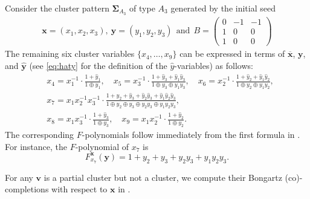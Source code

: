 \documentclass[11pt,reqno]{amsart}
\theoremstyle{plain}
\theoremstyle{definition}
\newtheorem{example}[theorem]{Example}
\numberwithin{equation}{section}
\newcommand\<{\langle}
\renewcommand\>{\rangle}
\def\vv{\mathbf{v}}
\newcommand{\DynA}[1]{A_{#1}}%
\def\seeds{\mathbf{\Sigma}}
\def\xx{\mathbf{x}}%
\def\yy{\mathbf{y}}%
\def\Fpoly{{F}}
\newcommand{\ol}[1]{\overline{#1}}
\begin{document}
Consider the cluster pattern $\seeds_{\DynA{3}}$ of type $\DynA{3}$ generated by the initial seed
\begin{gather}
    {\xx}=(x_1,x_2,x_3),~\yy=(y_1,y_2,y_3)~~\text{and}~~
    B=\left(
    \begin{array}{cccc}
        0 & -1 & -1\\
        1 & 0 & 0\\
        1 & 0 & 0
    \end{array}
    \right)
\end{gather}
The remaining six cluster variables $\{x_4,\ldots,x_9\}$ can be expressed in terms of $\ol{\xx}$, $\yy$, and $\hat{\yy}$ (see \eqref{eq:haty} for the definition of the $\hat{y}$-variables) as follows:
\begin{align*}
    &x_4=x_1^{-1}\cdot\frac{1+\hat{y}_1}{1\oplus y_1},\quad
    x_5=x_3^{-1}\cdot\frac{1+\hat{y}_3+\hat{y}_1\hat{y}_3}{1\oplus y_3\oplus y_1 y_3},\quad
    x_6=x_2^{-1}\cdot\frac{1+\hat{y}_2+\hat{y}_1\hat{y}_2}{1\oplus y_2\oplus y_1 y_2},\\
    &x_7=x_1x_2^{-1}x_3^{-1}\cdot\frac{1+\hat{y}_2+\hat{y}_3+\hat{y}_2\hat{y}_3+\hat{y}_1\hat{y}_2\hat{y}_3}{1\oplus y_2\oplus y_3\oplus y_2y_3\oplus y_1y_2y_3},\\
    &x_8=x_1x_3^{-1}\cdot\frac{1+\hat{y}_3}{1\oplus y_3},\quad
    x_9=x_1x_2^{-1}\cdot\frac{1+\hat{y}_2}{1\oplus y_2}.
\end{align*}
The corresponding $F$-polynomials follow immediately from the first formula in .
For instance, the $F$-polynomial of $x_7$ is
\[
\Fpoly^\xx_{x_7}(\yy)=1+y_2+y_3+y_2y_3+y_1y_2y_3.
\]

For any $\vv$ is a partial cluster but not a cluster,
we compute their Bongartz (co)-completions with respect to ${\xx}$ in .
\end{document}
